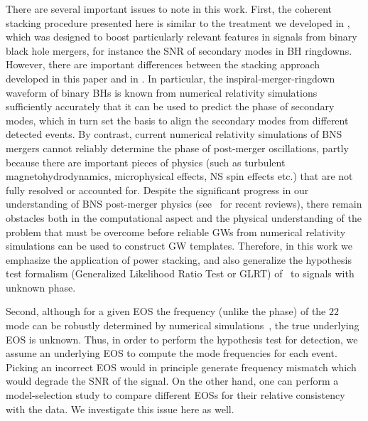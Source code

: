 \documentclass[prd,aps,floatfix,superscriptaddress,nofootinbib,twocolumn,10pt,English]{revtex4-1}
\begin{document}
There are several important issues to note in this work. 
First, the coherent stacking procedure presented here is similar to the treatment we
developed in \cite{yang2017black}, which was designed to boost
particularly relevant features in signals from binary black hole
mergers, for instance the SNR of secondary modes in BH
ringdowns. However, there are important differences between the
stacking approach developed in this paper and in \cite{yang2017black}.
In particular, the inspiral-merger-ringdown waveform of binary BHs is known
from numerical relativity simulations sufficiently accurately that it
can be used to predict the phase of secondary modes, which in turn set
the basis to align the secondary modes from different detected
events. By contrast, current numerical relativity simulations of BNS
mergers cannot reliably determine the phase of post-merger
oscillations, partly because there are important pieces of physics
(such as turbulent magnetohydrodynamics, microphysical effects, NS
spin effects etc.)  that are not fully resolved or accounted
for. Despite the significant progress in our understanding of BNS
post-merger physics (see~\cite{Baiotti:2016qnr,Paschalidis:2016vmz}
for recent reviews), there remain obstacles both in the computational
aspect and the physical understanding of the problem that must be
overcome before reliable GWs from numerical relativity simulations can
be used to construct GW templates. Therefore, in this work we
emphasize the application of power stacking, and also generalize the hypothesis test formalism (Generalized Likelihood Ratio
Test or GLRT) of~\cite{yang2017black} to signals with unknown phase.


Second, although for a given EOS the frequency (unlike the phase) of
the $22$ mode can be robustly determined by numerical
simulations~\cite{bauswein2015exploring}, the true underlying EOS is
unknown. Thus, in order to perform the hypothesis test for detection, we
assume an underlying EOS to compute the mode frequencies for each
event. Picking an incorrect EOS would in principle generate frequency
mismatch which would
degrade the SNR of the signal. On the other hand, one can perform a model-selection study to
compare different EOSs for their relative consistency with the
data. We investigate this issue here as well.
\end{document}
